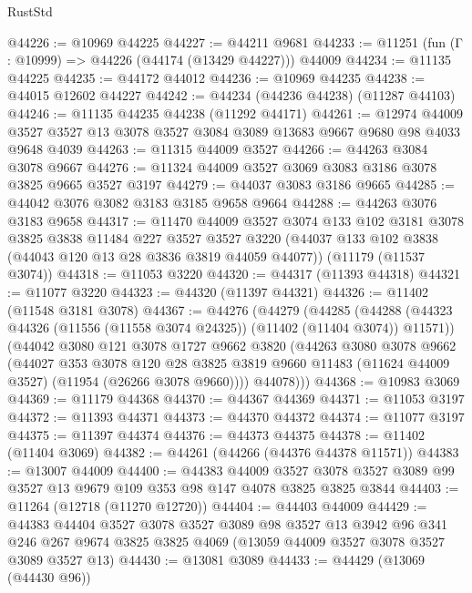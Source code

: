 \begin{lexlean}{RustStd}
\begin{coremodule}
@44226 := @10969 @44225
@44227 := @44211 @9681
@44233 := @11251 (fun (Γ : @10999) => @44226 (@44174 (@13429 @44227))) @44009
@44234 := @11135 @44225
@44235 := @44172 @44012
@44236 := @10969 @44235
@44238 := @44015 @12602 @44227
@44242 := @44234 (@44236 @44238) (@11287 @44103)
@44246 := @11135 @44235 @44238 (@11292 @44171)
@44261 := @12974
    @44009
    @3527
    @3527
    @13
    @3078
    @3527
    @3084
    @3089
    @13683
    @9667
    @9680
    @98
    @4033
    @9648
    @4039
@44263 := @11315 @44009 @3527
@44266 := @44263 @3084 @3078 @9667
@44276 := @11324 @44009 @3527 @3069 @3083 @3186 @3078 @3825 @9665 @3527 @3197
@44279 := @44037 @3083 @3186 @9665
@44285 := @44042 @3076 @3082 @3183 @3185 @9658 @9664
@44288 := @44263 @3076 @3183 @9658
@44317 := @11470
    @44009
    @3527
    @3074
    @133
    @102
    @3181
    @3078
    @3825
    @3838
    @11484
    @227
    @3527
    @3527
    @3220
    (@44037 @133 @102 @3838 (@44043 @120 @13 @28 @3836 @3819 @44059 @44077))
    (@11179 (@11537 @3074))
@44318 := @11053 @3220
@44320 := @44317 (@11393 @44318)
@44321 := @11077 @3220
@44323 := @44320 (@11397 @44321)
@44326 := @11402 (@11548 @3181 @3078)
@44367 := @44276
    (@44279
      (@44285
        (@44288 (@44323 @44326 (@11556 (@11558 @3074 @24325)) (@11402 (@11404 @3074)) @11571))
        (@44042
          @3080
          @121
          @3078
          @1727
          @9662
          @3820
          (@44263
            @3080
            @3078
            @9662
            (@44027
              @353
              @3078
              @120
              @28
              @3825
              @3819
              @9660
              @11483
              (@11624 @44009 @3527)
              (@11954 (@26266 @3078 @9660))))
          @44078)))
@44368 := @10983 @3069
@44369 := @11179 @44368
@44370 := @44367 @44369
@44371 := @11053 @3197
@44372 := @11393 @44371
@44373 := @44370 @44372
@44374 := @11077 @3197
@44375 := @11397 @44374
@44376 := @44373 @44375
@44378 := @11402 (@11404 @3069)
@44382 := @44261 (@44266 (@44376 @44378 @11571))
@44383 := @13007 @44009
@44400 := @44383
    @44009
    @3527
    @3078
    @3527
    @3089
    @99
    @3527
    @13
    @9679
    @109
    @353
    @98
    @147
    @4078
    @3825
    @3825
    @3844
@44403 := @11264 (@12718 (@11270 @12720))
@44404 := @44403 @44009
@44429 := @44383
    @44404
    @3527
    @3078
    @3527
    @3089
    @98
    @3527
    @13
    @3942
    @96
    @341
    @246
    @267
    @9674
    @3825
    @3825
    @4069
    (@13059 @44009 @3527 @3078 @3527 @3089 @3527 @13)
@44430 := @13081 @3089
@44433 := @44429 (@13069 (@44430 @96))

\end{coremodule}
\end{lexlean}
